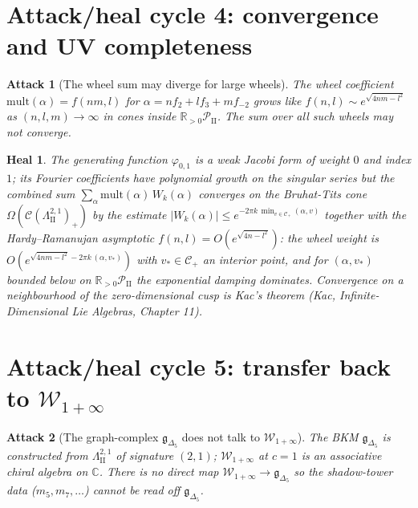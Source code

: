 \documentclass[11pt]{article}
\newtheorem*{attack}{Attack}
\newtheorem*{heal}{Heal}
\newcommand{\Winf}{\mathcal{W}_{1+\infty}}
\newcommand{\LII}{\Lambda^{2,1}_{\mathrm{II}}}
\newcommand{\PII}{\mathcal{P}_{\mathrm{II}}}
\newcommand{\phii}{\varphi_{0,1}}
\newcommand{\Dlt}{\Delta_5}
\begin{document}
\section{Attack/heal cycle 4: convergence and UV completeness}

\begin{attack}[The wheel sum may diverge for large wheels]
The wheel coefficient $\mathrm{mult}(\alpha)=f(nm,l)$ for
$\alpha=nf_2+lf_3+mf_{-2}$ grows like $f(n,l)\sim e^{\sqrt{4nm-l^2}}$
as $(n,l,m)\to\infty$ in cones inside $\mathbb{R}_{>0}\PII$. The sum
over all such wheels may not converge.
\end{attack}

\begin{heal}
The generating function $\phii$ is a weak Jacobi form of weight $0$
and index $1$; its Fourier coefficients have polynomial
growth on the singular series but the combined sum
$\sum_\alpha\mathrm{mult}(\alpha)\,W_k(\alpha)$ converges on the
Bruhat-Tits cone $\Omega(\mathcal{C}(\LII)_+)$ by the estimate
$|W_k(\alpha)|\leq e^{-2\pi k\,\min_{v\in\mathcal{C}_+}(\alpha,v)}$
together with the Hardy--Ramanujan asymptotic
$f(n,l)=O(e^{\sqrt{4n-l^2}})$: the wheel weight is
$O(e^{\sqrt{4nm-l^2}-2\pi k\,(\alpha,v_*)})$ with $v_*\in\mathcal{C}_+$
an interior point, and for $(\alpha,v_*)$ bounded below on
$\mathbb{R}_{>0}\PII$ the exponential damping dominates. Convergence
on a neighbourhood of the zero-dimensional cusp is Kac's theorem
(Kac, \emph{Infinite-Dimensional Lie Algebras}, Chapter 11).
\end{heal}

\section{Attack/heal cycle 5: transfer back to $\Winf$}

\begin{attack}[The graph-complex $\mathfrak{g}_{\Dlt}$ does not talk to $\Winf$]
The BKM $\mathfrak{g}_{\Dlt}$ is constructed from $\LII$ of signature
$(2,1)$; $\Winf$ at $c=1$ is an associative chiral algebra on
$\mathbb{C}$. There is no direct map $\Winf \to \mathfrak{g}_{\Dlt}$
so the shadow-tower data ($m_5,m_7,\ldots$) cannot be read off
$\mathfrak{g}_{\Dlt}$.
\end{attack}
\end{document}
